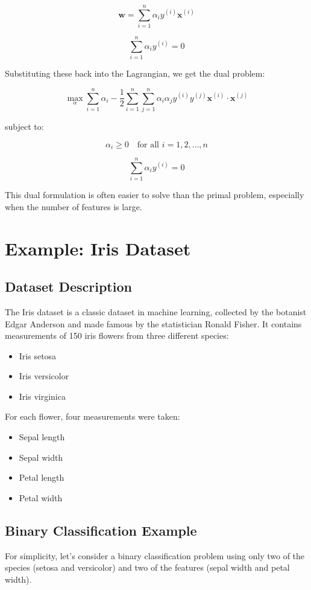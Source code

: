 \documentclass{article}
\begin{document}
\[
\mathbf{w} = \sum_{i=1}^{n} \alpha_i y^{(i)} \mathbf{x}^{(i)}
\]

\[
\sum_{i=1}^{n} \alpha_i y^{(i)} = 0
\]

Substituting these back into the Lagrangian, we get the dual problem:

\[
\max_{\alpha} \sum_{i=1}^{n} \alpha_i - \frac{1}{2} \sum_{i=1}^{n} \sum_{j=1}^{n} \alpha_i \alpha_j y^{(i)} y^{(j)} \mathbf{x}^{(i)} \cdot \mathbf{x}^{(j)}
\]

subject to:

\[
\alpha_i \geq 0 \quad \text{for all } i = 1, 2, \ldots, n
\]

\[
\sum_{i=1}^{n} \alpha_i y^{(i)} = 0
\]

This dual formulation is often easier to solve than the primal problem, especially when the number of features is large.

\section{Example: Iris Dataset}

\subsection{Dataset Description}
The Iris dataset is a classic dataset in machine learning, collected by the botanist Edgar Anderson and made famous by the statistician Ronald Fisher. It contains measurements of 150 iris flowers from three different species:

\begin{itemize}
    \item Iris setosa
    \item Iris versicolor
    \item Iris virginica
\end{itemize}

For each flower, four measurements were taken:
\begin{itemize}
    \item Sepal length
    \item Sepal width
    \item Petal length
    \item Petal width
\end{itemize}

\subsection{Binary Classification Example}
For simplicity, let's consider a binary classification problem using only two of the species (setosa and versicolor) and two of the features (sepal width and petal width).
\end{document}
